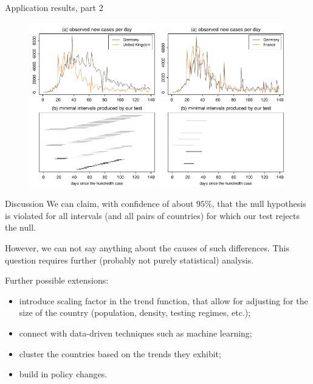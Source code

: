 \documentclass[10pt, handout]{beamer}
\begin{document}
\begin{frame}{Application results, part 2}
	\begin{figure}
		\includegraphics[width=0.49\textwidth]{plots/DEU_vs_GBR_presentation}
		\hfill
		\includegraphics[width=0.49\textwidth]{plots/DEU_vs_FRA_presentation}
	\end{figure}
\end{frame}


\begin{frame}{Discussion}
We can claim, with confidence of about $95\%$, that the null hypothesis is violated for all intervals (and all pairs of countries) for which our test rejects the null. \pause

However, we can not say anything about the causes of such differences. This question requires further (probably not purely statistical) analysis.\pause

Further possible extensions:
\vspace{-2mm}
\begin{itemize}
	\item introduce scaling factor in the trend function, that allow for adjusting for the size of the country (population, density, testing regimes, etc.);\pause
	\item connect with data-driven techniques such as machine learning;\pause
	\item cluster the countries based on the trends they exhibit; \pause
	\item build in policy changes.
\end{itemize}
\end{frame}
\end{document}

